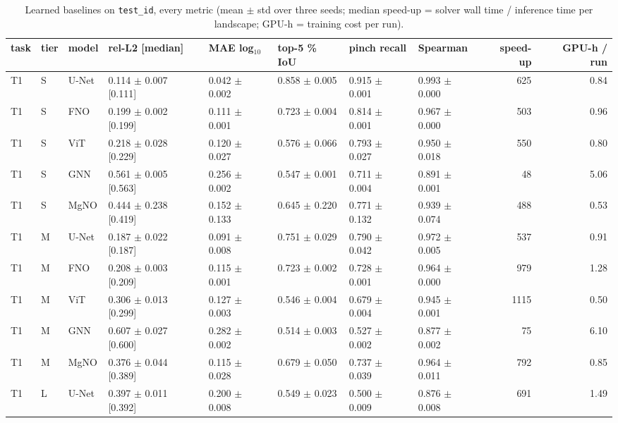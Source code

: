 \begin{table}[tb]
\centering
\scriptsize
\setlength{\tabcolsep}{3.5pt}
\caption{Learned baselines on \texttt{test\_id}, every metric (mean $\pm$ std over three seeds; median speed-up = solver wall time / inference time per landscape; GPU-h = training cost per run).}
\label{tab:baselines_full}
\setlength{\tabcolsep}{2.2pt}
\begin{tabular}{llllllllrr}
\toprule
task & tier & model & rel-L2 [median] & MAE log$_{10}$ & top-5 \% IoU & pinch recall & Spearman & speed-up & GPU-h / run \\
\midrule
T1 & S & U-Net & 0.114 $\pm$ 0.007 [0.111] & 0.042 $\pm$ 0.002 & 0.858 $\pm$ 0.005 & 0.915 $\pm$ 0.001 & 0.993 $\pm$ 0.000 & 625 & 0.84 \\
T1 & S & FNO & 0.199 $\pm$ 0.002 [0.199] & 0.111 $\pm$ 0.001 & 0.723 $\pm$ 0.004 & 0.814 $\pm$ 0.001 & 0.967 $\pm$ 0.000 & 503 & 0.96 \\
T1 & S & ViT & 0.218 $\pm$ 0.028 [0.229] & 0.120 $\pm$ 0.027 & 0.576 $\pm$ 0.066 & 0.793 $\pm$ 0.027 & 0.950 $\pm$ 0.018 & 550 & 0.80 \\
T1 & S & GNN & 0.561 $\pm$ 0.005 [0.563] & 0.256 $\pm$ 0.002 & 0.547 $\pm$ 0.001 & 0.711 $\pm$ 0.004 & 0.891 $\pm$ 0.001 & 48 & 5.06 \\
T1 & S & MgNO & 0.444 $\pm$ 0.238 [0.419] & 0.152 $\pm$ 0.133 & 0.645 $\pm$ 0.220 & 0.771 $\pm$ 0.132 & 0.939 $\pm$ 0.074 & 488 & 0.53 \\
T1 & M & U-Net & 0.187 $\pm$ 0.022 [0.187] & 0.091 $\pm$ 0.008 & 0.751 $\pm$ 0.029 & 0.790 $\pm$ 0.042 & 0.972 $\pm$ 0.005 & 537 & 0.91 \\
T1 & M & FNO & 0.208 $\pm$ 0.003 [0.209] & 0.115 $\pm$ 0.001 & 0.723 $\pm$ 0.002 & 0.728 $\pm$ 0.001 & 0.964 $\pm$ 0.000 & 979 & 1.28 \\
T1 & M & ViT & 0.306 $\pm$ 0.013 [0.299] & 0.127 $\pm$ 0.003 & 0.546 $\pm$ 0.004 & 0.679 $\pm$ 0.004 & 0.945 $\pm$ 0.001 & 1115 & 0.50 \\
T1 & M & GNN & 0.607 $\pm$ 0.027 [0.600] & 0.282 $\pm$ 0.002 & 0.514 $\pm$ 0.003 & 0.527 $\pm$ 0.002 & 0.877 $\pm$ 0.002 & 75 & 6.10 \\
T1 & M & MgNO & 0.376 $\pm$ 0.044 [0.389] & 0.115 $\pm$ 0.028 & 0.679 $\pm$ 0.050 & 0.737 $\pm$ 0.039 & 0.964 $\pm$ 0.011 & 792 & 0.85 \\
T1 & L & U-Net & 0.397 $\pm$ 0.011 [0.392] & 0.200 $\pm$ 0.008 & 0.549 $\pm$ 0.023 & 0.500 $\pm$ 0.009 & 0.876 $\pm$ 0.008 & 691 & 1.49 \\

\end{tabular}
\end{table}
